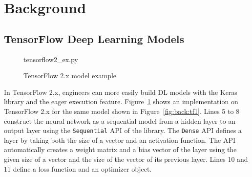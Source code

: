 \section{Background}\label{sec:background}

\subsection{TensorFlow Deep Learning Models}


\begin{figure}[ht!]
  
{tensorflow2_ex.py}
  \caption{TensorFlow 2.x model example}
\label{fig:back:tf2}
\end{figure}

In TensorFlow 2.x, engineers can more easily build DL models with the Keras
library and the eager execution feature.
Figure~\ref{fig:back:tf2} shows an implementation on TensorFlow 2.x for the
same model shown in Figure~\ref{fig:back:tf1}.
Lines 5 to 8 construct the neural network as a sequential model from a
hidden layer to an output layer using the {\tt Sequential} API of the
library.
The {\tt Dense} API defines a layer by taking both the size of a vector and an
activation function. 
The API automatically creates a weight matrix and a bias vector of the layer
using the given size of a vector and the size of the vector of its previous
layer.
Lines 10 and 11 define a loss function and an optimizer object.  
